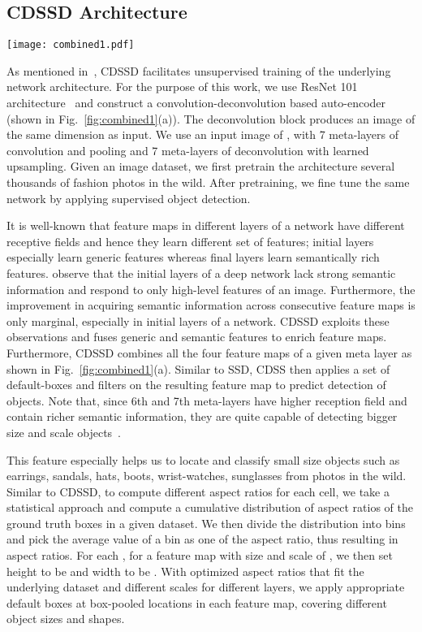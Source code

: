 \documentclass[sigconf]{acmart}
\begin{document}
\subsection{CDSSD Architecture}

\begin{figure*}[t]
\centering
\texttt{[image: combined1.pdf]}
\caption{CDSSD combines information from convolution and deconvolution feature maps}
\label{fig:combined1}
\end{figure*}

As mentioned in~\cite{CDSSD18},
CDSSD facilitates unsupervised training of 
the underlying network architecture.
For the purpose of this work,
we use ResNet 101 architecture~\cite{resnet101} and construct
a convolution-deconvolution based auto-encoder
(shown in Fig.~\ref{fig:combined1}(a)).
The deconvolution block produces an image of the same dimension as input.
We use an input image of , with 7 meta-layers of convolution
and pooling and 7 meta-layers of deconvolution with learned upsampling.
Given an image dataset, we first pretrain the architecture 
several thousands of fashion photos in the wild.
After pretraining, we fine tune the same network 
by applying supervised object detection.

It is well-known that feature maps in different layers
of a network have different receptive fields and hence
they learn different set of features; initial layers
especially learn generic features whereas final layers
learn semantically rich features.
\cite{objectdetectorref1,objectdetectorref2} observe
that the initial layers of a deep network lack 
strong semantic information and respond to only
high-level features of an image.
Furthermore, the improvement in acquiring semantic
information across consecutive feature maps is only marginal,
especially in initial layers of a network.
CDSSD exploits these observations
and fuses generic and semantic features to enrich feature maps.
Furthermore, CDSSD combines all the four feature maps of a given
meta layer as shown in Fig.~\ref{fig:combined1}(a).
Similar to SSD, CDSS then applies a set of  default-boxes
and  filters on the resulting
feature map to predict detection of objects.
Note that, since 6th and 7th meta-layers have higher reception field
and contain richer semantic information,
they are quite capable of 
detecting bigger size and scale objects~\cite{FuLRTB17}.

This feature especially helps us to locate and classify
small size objects such as earrings, sandals, hats, boots,
wrist-watches, sunglasses from photos in the wild.
Similar to CDSSD,
to compute different aspect ratios for each cell, we take a statistical approach
and compute a cumulative distribution of aspect ratios
of the ground truth boxes in a given dataset.
We then divide the distribution into  bins
and pick the average value of a bin as one of the aspect ratio,
thus resulting in  aspect ratios.
For each , 
for a feature map with size
 and scale of ,
we then set height to be
 and width to be
.
With optimized aspect ratios that fit the underlying dataset
and different scales for different layers,
we apply appropriate default boxes at box-pooled locations
in each feature map, covering different object sizes and shapes.
\end{document}

